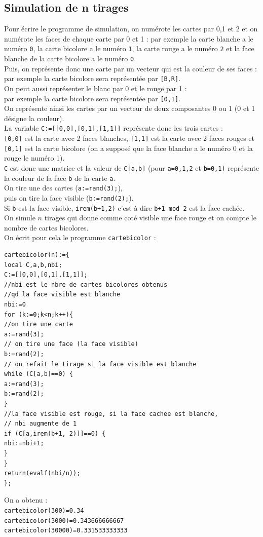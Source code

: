 \documentclass[a4paper,11pt]{book}
\begin{document}
\subsection{Simulation de n tirages}
Pour \'ecrire le programme de simulation,
on num\'erote les cartes par 0,1 et 2 et on num\'erote les faces de chaque 
carte par 0 et 1 : par exemple la carte blanche a le num\'ero {\tt 0},
la carte bicolore a le num\'ero {\tt 1}, la carte rouge a le num\'ero {\tt 2}
 et la face blanche de la carte bicolore a le num\'ero {\tt 0}.\\
Puis, on repr\'esente donc une carte par un vecteur qui est la couleur de ses 
faces :\\
 par exemple la carte bicolore sera repr\'esent\'ee par {\tt [B,R]}.\\
On peut aussi repr\'esenter le blanc par 0 et le rouge par 1 : \\
par exemple la carte bicolore sera repr\'esent\'ee par {\tt [0,1]}.\\
On repr\'esente ainsi les cartes par un vecteur de deux composantes 0 ou 1 
(0 et 1 d\'esigne la couleur).\\
La variable {\tt C:=[[0,0],[0,1],[1,1]]} repr\'esente donc les trois cartes :\\
{\tt [0,0]} est la carte avec 2 faces blanches, {\tt [1,1]} est la carte 
avec 2 faces rouges et {\tt [0,1]} est la carte bicolore (on a suppos\'e que 
la face blanche a le num\'ero 0 et la rouge le num\'ero 1).\\ 
{\tt C} est donc une matrice et la valeur de {\tt C[a,b]} (pour  {\tt a=0,1,2} 
et {\tt b=0,1)} repr\'esente la couleur de la face {\tt b} de la carte {\tt a}.\\
On tire une des cartes ({\tt a:=rand(3);}),\\
 puis on tire la face visible ({\tt b:=rand(2);}).\\
 Si {\tt b} est la face visible, {\tt irem(b+1,2)} c'est
\`a dire {\tt b+1 mod 2} est la face cach\'ee.\\
On simule $n$ tirages qui donne comme cot\'e visible une face rouge et on 
compte le nombre de cartes bicolores.\\
On \'ecrit pour cela le programme {\tt cartebicolor} :
\begin{verbatim}
cartebicolor(n):={
local C,a,b,nbi;
C:=[[0,0],[0,1],[1,1]];
//nbi est le nbre de cartes bicolores obtenus 
//qd la face visible est blanche
nbi:=0
for (k:=0;k<n;k++){
//on tire une carte
a:=rand(3);
// on tire une face (la face visible)
b:=rand(2);
// on refait le tirage si la face visible est blanche
while (C[a,b]==0) {
a:=rand(3);
b:=rand(2);
}
//la face visible est rouge, si la face cachee est blanche,
// nbi augmente de 1
if (C[a,irem(b+1, 2)]]==0) {
nbi:=nbi+1;
}
}
return(evalf(nbi/n));
};
\end{verbatim} 
On a obtenu :\\
{\tt cartebicolor(300)=0.34}\\ 
{\tt cartebicolor(3000)=0.343666666667}\\
{\tt cartebicolor(30000)=0.331533333333}
\end{document}

